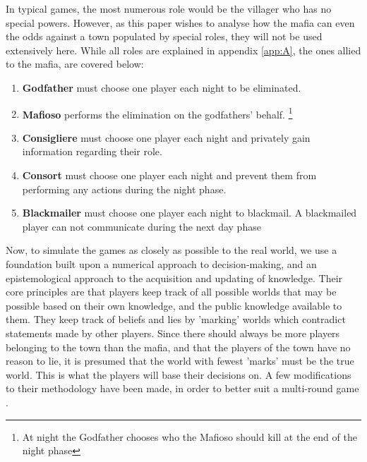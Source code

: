 In typical games, the most numerous role would be the villager who has no
special powers. However, as this paper wishes to analyse how the mafia can even
the odds against a town populated by special roles, they will not be used
extensively here. While all roles are explained in appendix \ref{app:A}, the
ones allied to the mafia, are covered below:

\begin{enumerate}
	\itemsep0px
	\item\textbf{Godfather} must choose one player each night to be eliminated.
	\item\textbf{Mafioso} performs the elimination on the godfathers' behalf. \footnote{At night the Godfather chooses who the Mafioso should kill at the end of the night phase}
	\item\textbf{Consigliere} must choose one player each night and privately
	      gain information regarding their role.
	\item\textbf{Consort} must choose one player each night and prevent them
	      from performing any actions during the night phase.
	\item\textbf{Blackmailer} must choose one player each night to blackmail. A
	      blackmailed player can not communicate during the next day phase
	      \label{lst:Roles}
\end{enumerate}

Now, to simulate the games as closely as possible to the real world, we use a
foundation built upon a numerical approach to decision-making, and an
epistemological approach to the acquisition and updating of
knowledge\cite{commitment}. Their core principles are that players keep track
of all possible worlds that may be possible based on their own knowledge, and
the public knowledge available to them. They keep track of beliefs and lies by
'marking' worlds which contradict statements made by other players. Since there
should always be more players belonging to the town than the mafia, and that
the players of the town have no reason to lie, it is presumed that the world
with fewest 'marks' must be the true world. This is what the players will base
their decisions on. A few modifications to their methodology have been made, in
order to better suit a multi-round game \cite{commitment}.

